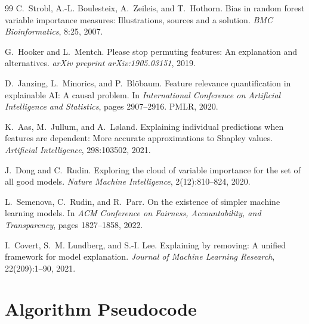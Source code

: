 \documentclass[11pt]{article}
\begin{document}
\begin{thebibliography}{99}
C.~Strobl, A.-L. Boulesteix, A.~Zeileis, and T.~Hothorn.
\newblock Bias in random forest variable importance measures: Illustrations,
  sources and a solution.
\newblock \emph{BMC Bioinformatics}, 8:25, 2007.

G.~Hooker and L.~Mentch.
\newblock Please stop permuting features: An explanation and alternatives.
\newblock \emph{arXiv preprint arXiv:1905.03151}, 2019.

D.~Janzing, L.~Minorics, and P.~Bl{\"o}baum.
\newblock Feature relevance quantification in explainable {AI}: A causal
  problem.
\newblock In \emph{International Conference on Artificial Intelligence and
  Statistics}, pages 2907--2916. PMLR, 2020.

K.~Aas, M.~Jullum, and A.~L{\o}land.
\newblock Explaining individual predictions when features are dependent:
  More accurate approximations to {S}hapley values.
\newblock \emph{Artificial Intelligence}, 298:103502, 2021.

J.~Dong and C.~Rudin.
\newblock Exploring the cloud of variable importance for the set of all good
  models.
\newblock \emph{Nature Machine Intelligence}, 2(12):810--824, 2020.

L.~Semenova, C.~Rudin, and R.~Parr.
\newblock On the existence of simpler machine learning models.
\newblock In \emph{ACM Conference on Fairness, Accountability, and
  Transparency}, pages 1827--1858, 2022.

I.~Covert, S.~M. Lundberg, and S.-I. Lee.
\newblock Explaining by removing: A unified framework for model explanation.
\newblock \emph{Journal of Machine Learning Research}, 22(209):1--90, 2021.

\end{thebibliography}


\appendix

\section{Algorithm Pseudocode}
\label{app:algorithm}
\end{document}
